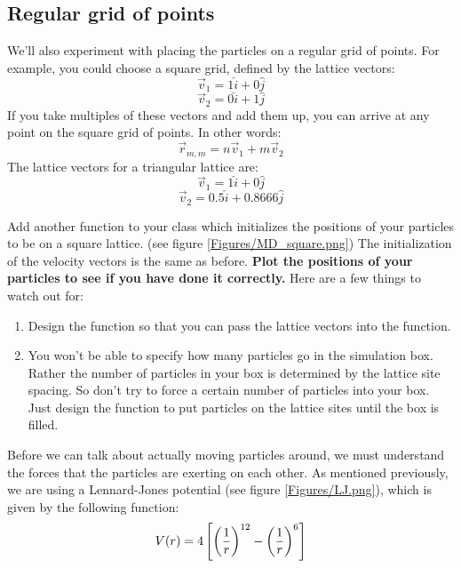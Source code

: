 \subsection*{Regular grid of points}
We'll also experiment with placing the particles on a regular grid of
points.  For example, you could choose a square grid, defined by the
lattice vectors:
\[\vec{v}_1 = 1 \hat{i} + 0 \hat{j}\]
\[\vec{v}_2 = 0 \hat{i} + 1 \hat{j}\]
If you take multiples of these vectors and add them up, you can arrive
at any point on the square grid of points.  In other words:
\begin{equation}
\vec{r}_{m,m} = n \vec{v}_1 + m \vec{v}_2
\end{equation}
The lattice vectors for a triangular lattice are: 
\[\vec{v}_1 = 1 \hat{i} + 0 \hat{j}\]
\[\vec{v}_2 = 0.5 \hat{i} + 0.8666 \hat{j}\]
\begin{enumerate}
  \probtwo Add another function to your class which initializes the
  positions of your particles to be on a square lattice. (see figure \ref{Figures/MD_square.png})  The
  initialization of the velocity vectors is the same as
  before. \textbf{Plot the positions of your particles to see if you
    have done it correctly.}  Here are a few things to watch out for:
\begin{enumerate}
\item  Design the function so that you can pass the lattice vectors
  into the function.
\item  You won't be able to specify how many particles go in the
  simulation box.  Rather the number of particles in your box
  is determined by the lattice site spacing.  So don't try to force
  a certain number of particles into your box.  Just design the function to put
  particles on the lattice sites until the box is filled.
\end{enumerate}
\end{enumerate}

Before we can talk about actually moving particles around, we must
understand the forces that the particles are exerting on each other.
As mentioned previously, we are using a Lennard-Jones potential (see
figure \ref{Figures/LJ.png}), which is given by the following
function:
\begin{equation}\label{eq:LJ}
V(r) = 4 \left[\left({1\over r}\right)^{12} - \left({1 \over r}\right)^6 \right]
\end{equation}

